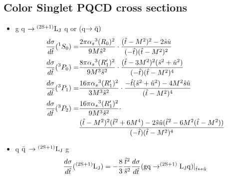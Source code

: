 \documentclass[aps,prc,preprint,superscriptaddress,showpacs,showkeys,amsmath]{revtex4-1}
\begin{document}
\subsection{\bf Color Singlet PQCD cross sections}
\begin{itemize}
\item g q $\rightarrow {\rm ^{(2S+1)}L_{J}}$ q or (q$\rightarrow \bar{\rm q})$
\begin{equation}
\begin{split}
\frac{d\sigma}{d{\hat{t}}}(^1S_0) = &\frac{2\pi{\alpha_{s}}^{3} (R_{0})^{2}}{9M{\hat{s}}^2}\cdot\frac{({\hat{t}}-M^2)^{2}-2{\hat{s}}{\hat{u}}}{(-{\hat{t}})({\hat{t}}-M^2)^{2}}\\
\frac{d\sigma}{d{\hat{t}}}(^3P_0) = &\frac{8\pi{\alpha_{s}}^3 (R_{1}^\prime)^{2}}{9M^{3}{\hat{s}}^2}\cdot\frac{({\hat{t}}-3M^2)^{2}({\hat{s}}^2+{\hat{u}}^2)}{(-{\hat{t}})({\hat{t}}-M^2)^{4}}\\
\frac{d\sigma}{d{\hat{t}}}(^3P_1) = &\frac{16\pi{\alpha_{s}}^3 (R_{1}^\prime)^{2}}{3M^{3}{\hat{s}}^2}\cdot\frac{-{\hat{t}}({\hat{s}}^2+{\hat{u}}^2)-4M^2{\hat{s}}{\hat{u}}}{({\hat{t}}-M^2)^{4}}\\
\frac{d\sigma}{d{\hat{t}}}(^3P_2) = &\frac{16\pi{\alpha_{s}}^3 (R_{1}^\prime)^{2}}{9M^{3}{\hat{s}}^2} \cdot \\
                              &\frac{({\hat{t}}-M^2)^2({\hat{t}}^2+6M^4)-2{\hat{s}}{\hat{u}}({\hat{t}}^2-6M^2({\hat{t}}-M^2))}{(-{\hat{t}})({\hat{t}}-M^2)^4}
\end{split}  
\end{equation}
\item q $\bar{\rm q}$ $\rightarrow {\rm ^{(2S+1)}L_{J}}$ g
\begin{equation}
\frac{d\sigma}{d{\hat{t}}}({\rm ^{(2S+1)}L_{J}})=-\frac{8}{3}\frac{{\hat{t}}^2}{{\hat{s}}^2}\frac{d\sigma}{d{\hat{t}}}({\rm g q \rightarrow ^{(2S+1)}L_{J} q})|_{{\hat{t}}\leftrightarrow{\hat{u}}}
\end{equation}

\end{itemize}
\end{document}
